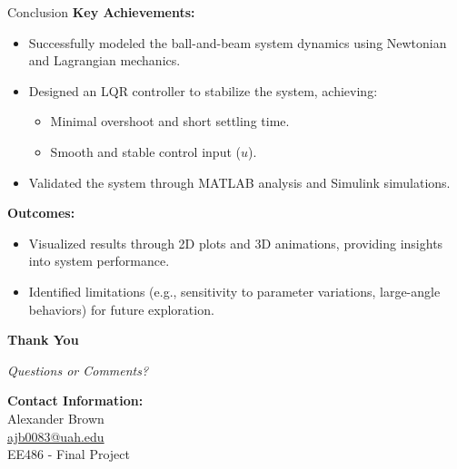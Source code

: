 \documentclass{beamer}
\begin{document}
\begin{frame}{Conclusion}
    \textbf{Key Achievements:}
    \begin{itemize}
        \item Successfully modeled the ball-and-beam system dynamics using Newtonian and Lagrangian mechanics.
        \item Designed an LQR controller to stabilize the system, achieving:
        \begin{itemize}
            \footnotesize
            \item Minimal overshoot and short settling time.
            \item Smooth and stable control input (\(u\)).
        \end{itemize}
        \item Validated the system through MATLAB analysis and Simulink simulations.
    \end{itemize}

    \vspace{0.2cm}
    \textbf{Outcomes:}
    \begin{itemize}
        \item Visualized results through 2D plots and 3D animations, providing insights into system performance.
        \item Identified limitations (e.g., sensitivity to parameter variations, large-angle behaviors) for future exploration.
    \end{itemize}
\end{frame}

\begin{frame}
    \centering
    \vspace{1.5cm}
    \Huge{\textbf{Thank You}}
    
    \vspace{0.5cm}
    \Large
    \textit{Questions or Comments?}
    
    \vspace{1.5cm}
    \normalsize
    \textbf{Contact Information:} \\
    Alexander Brown \\
    \href{mailto:ajb0083@uah.edu}{ajb0083@uah.edu} \\
    EE486 - Final Project
\end{frame}
\end{document}
